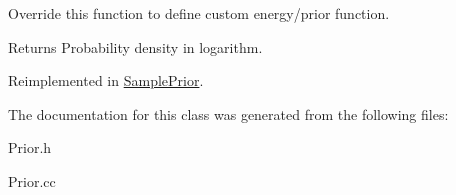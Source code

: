Override this function to define custom energy/prior function. 

\begin{DoxyReturn}{Returns}
Probability density in logarithm. 
\end{DoxyReturn}


Reimplemented in \hyperlink{classSamplePrior_af1209bf9710e4c336084c18b3eba3547}{Sample\-Prior}.



The documentation for this class was generated from the following files\-:\begin{DoxyCompactItemize}
\item 
Prior.\-h\item 
Prior.\-cc\end{DoxyCompactItemize}
